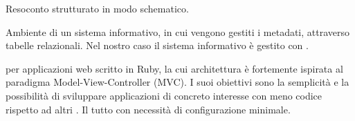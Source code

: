 
\begin{itemize}

Resoconto strutturato in modo schematico.


Ambiente di un sistema informativo, in cui vengono gestiti i metadati, attraverso tabelle relazionali.
Nel nostro caso il sistema informativo è gestito con .


  per applicazioni web scritto in Ruby, la cui architettura è fortemente ispirata al paradigma Model-View-Controller (MVC). I suoi obiettivi sono la semplicità e la possibilità di sviluppare applicazioni di concreto interesse con meno codice rispetto ad altri . Il tutto con necessità di configurazione minimale.

\end{itemize}


